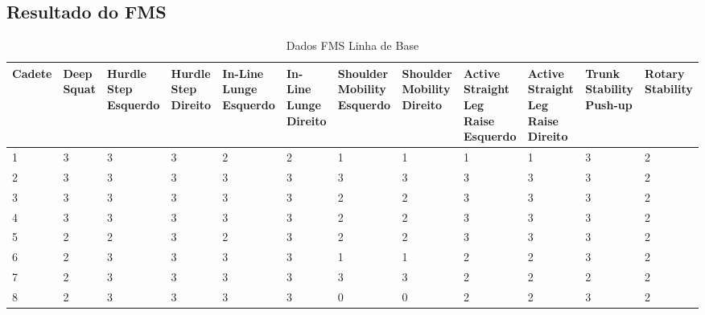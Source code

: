 \begin{landscape}
    \chapter{Resultado do \acrshort{FMS}}
    
    \begin{table}[h]
        \centering
        \caption{Dados FMS Linha de Base}
        \renewcommand{\arraystretch}{1.3}  %
        \begin{adjustbox}{scale=0.9}
        \begin{tabular}{|p{1.8cm}|p{1.6cm}|p{1.6cm}|p{1.6cm}|p{1.6cm}|p{1.6cm}|p{1.6cm}|p{1.6cm}|p{1.6cm}|p{1.6cm}|p{1.6cm}|p{1.6cm}|}
            \hline
            \textbf{Cadete} & \textbf{Deep Squat} & \textbf{Hurdle Step Esquerdo} & \textbf{Hurdle Step Direito} & \textbf{In-Line Lunge Esquerdo} & \textbf{In-Line Lunge Direito} & \textbf{Shoulder Mobility Esquerdo} & \textbf{Shoulder Mobility Direito} & \textbf{Active Straight Leg Raise Esquerdo} & \textbf{Active Straight Leg Raise Direito} & \textbf{Trunk Stability Push-up} & \textbf{Rotary Stability} \\
            \hline
            1 & 3 & 3 & 3 & 2 & 2 & 1 & 1 & 1 & 1 & 3 & 2 \\
            2 & 3 & 3 & 3 & 3 & 3 & 3 & 3 & 3 & 3 & 3 & 2 \\
            3 & 3 & 3 & 3 & 3 & 3 & 2 & 2 & 3 & 3 & 3 & 2 \\
            4 & 3 & 3 & 3 & 3 & 3 & 2 & 2 & 3 & 3 & 3 & 2 \\
            5 & 2 & 2 & 3 & 2 & 3 & 2 & 2 & 3 & 3 & 3 & 2 \\
            6 & 2 & 3 & 3 & 3 & 3 & 1 & 1 & 2 & 2 & 3 & 2 \\
            7 & 2 & 3 & 3 & 3 & 3 & 3 & 3 & 2 & 2 & 2 & 2 \\
            8 & 2 & 3 & 3 & 3 & 3 & 0 & 0 & 2 & 2 & 3 & 2 \\
            \hline
        \end{tabular}
        \end{adjustbox}
    \end{table}
    

\end{landscape}
